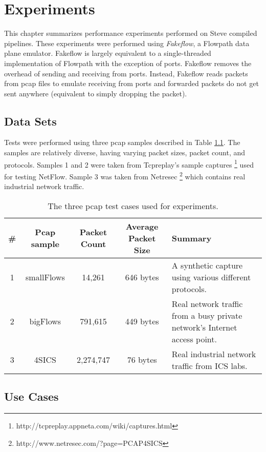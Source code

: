 \chapter{Experiments} \label{ch:experiments}

This chapter summarizes performance experiments performed on Steve compiled pipelines. These experiments were performed using \textit{Fakeflow}, a Flowpath data plane emulator. Fakeflow is largely equivalent to a single-threaded implementation of Flowpath with the exception of ports. Fakeflow removes the overhead of sending and receiving from ports. Instead, Fakeflow reads packets from pcap files to emulate receiving from ports and forwarded packets do not get sent anywhere (equivalent to simply dropping the packet).

\section{Data Sets} \label{exp:use_cases}

Tests were performed using three pcap samples described in Table \ref{tbl:pcap}. 
The samples are relatively diverse, having varying packet sizes, packet count, and protocols. Samples 1 and 2 were taken from Tcpreplay's sample captures \footnote{http://tcpreplay.appneta.com/wiki/captures.html} used for testing NetFlow. Sample 3 was taken from Netresec \footnote{http://www.netresec.com/?page=PCAP4SICS} which contains real industrial network traffic.

\begin{table}
\caption{The three pcap test cases used for experiments.}
\begin{center}
\begin{tabularx}{\linewidth}{| c || c | c | c | X |}
\hline
\# & Pcap sample & Packet Count & Average Packet Size & Summary \\
\hline
1 & smallFlows & 14,261 & 646 bytes & A synthetic capture using various different protocols. \\
\hline
2 & bigFlows & 791,615 & 449 bytes & Real network traffic from a busy private network's Internet access point. \\
\hline
3 & 4SICS & 2,274,747 & 76 bytes & Real industrial network traffic from ICS labs. \\
\hline
\end{tabularx}
\end{center}
\label{tbl:pcap}
\end{table}


\section{Use Cases}

